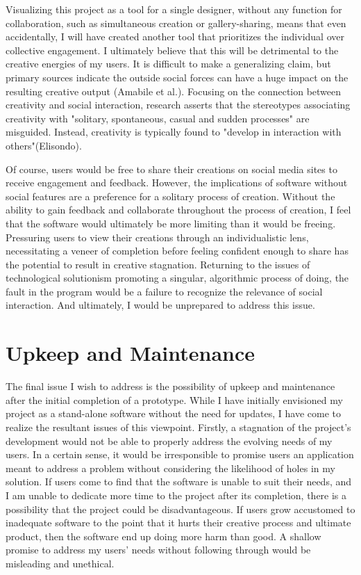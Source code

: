 \documentclass[10pt,twocolumn]{article}
\begin{document}
Visualizing this project as a tool for a single designer, without any function for collaboration, such as simultaneous creation or gallery-sharing, means that even accidentally, I will have created another tool that prioritizes the individual over collective engagement. I ultimately believe that this will be detrimental to the creative energies of my users. It is difficult to make a generalizing claim, but primary sources indicate the outside social forces can have a huge impact on the resulting creative output (Amabile et al.). Focusing on the connection between creativity and social interaction, research asserts that the stereotypes associating creativity with "solitary, spontaneous, casual and sudden processes" are misguided. Instead, creativity is typically found to "develop in interaction with others"(Elisondo).

Of course, users would be free to share their creations on social media sites to receive engagement and feedback. However, the implications of software without social features are a preference for a solitary process of creation. Without the ability to gain feedback and collaborate throughout the process of creation, I feel that the software would ultimately be more limiting than it would be freeing. Pressuring users to view their creations through an individualistic lens, necessitating a veneer of completion before feeling confident enough to share has the potential to result in creative stagnation. Returning to the issues of technological solutionism promoting a singular, algorithmic process of doing, the fault in the program would be a failure to recognize the relevance of social interaction. And ultimately, I would be unprepared to address this issue. 

\section{Upkeep and Maintenance} 
The final issue I wish to address is the possibility of upkeep and maintenance after the initial completion of a prototype. While I have initially envisioned my project as a stand-alone software without the need for updates, I have come to realize the resultant issues of this viewpoint. Firstly, a stagnation of the project's development would not be able to properly address the evolving needs of my users. In a certain sense, it would be irresponsible to promise users an application meant to address a problem without considering the likelihood of holes in my solution. If users come to find that the software is unable to suit their needs, and I am unable to dedicate more time to the project after its completion, there is a possibility that the project could be disadvantageous. If users grow accustomed to inadequate software to the point that it hurts their creative process and ultimate product, then the software end up doing more harm than good. A shallow promise to address my users' needs without following through would be misleading and unethical. 
\end{document}
